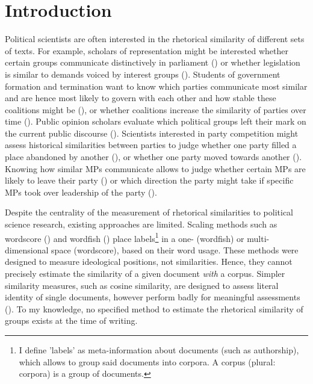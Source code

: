 \documentclass{article}
\begin{document}
\section{Introduction}
\label{sec:Intro}
Political scientists are often interested in the rhetorical similarity of different sets of texts. For example, scholars of representation might be interested whether certain groups communicate distinctively in parliament (\cite{Pitkin1967}) or whether legislation is similar to demands voiced by interest groups (\cite{Kluver2019}). Students of government formation and termination want to know which parties communicate most similar and are hence most likely to govern with each other and how stable these coalitions might be (\cite{Gamson1961, Grofman1994}), or whether coalitions increase the similarity of parties over time (\cite{Spoon2019}). Public opinion scholars evaluate which political groups left their mark on the current public discourse (\cite{Wagner2017, Slothuus2010k}). Scientists interested in party competition might assess historical similarities between parties to judge whether one party filled a place abandoned by another (\cite{Kitschelt1986}), or whether one party moved towards another (\cite{Downs1957, Meguid2005b}). Knowing how similar MPs communicate allows to judge whether certain MPs are likely to leave their party (\cite{Hirschman1970}) or which direction the party might take if specific MPs took over leadership of the party (\cite{Fernandez-Vazquez2016}).\par

Despite the centrality of the measurement of rhetorical similarities to political science research, existing approaches are limited. Scaling methods such as wordscore (\cite{Laver2003}) and wordfish (\cite{Slapin2008}) place labels\footnote{I define 'labels' as meta-information about documents (such as authorship), which allows to group said documents into corpora. A corpus (plural: corpora) is a group of documents.} in a one- (wordfish) or multi-dimensional space (wordscore), based on their word usage. These methods were designed to measure ideological positions, not similarities. Hence, they cannot precisely estimate the similarity of a given document \textit{with} a corpus. Simpler similarity measures, such as cosine similarity, are designed to assess literal identity of single documents, however perform badly for meaningful assessments (\cite{Prasetya2018}). To my knowledge, no specified method to estimate the rhetorical similarity of groups exists at the time of writing.\par
\end{document}
